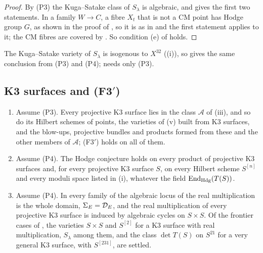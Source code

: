 \begin{proof}
By \textup{(P3)} the Kuga--Satake class of $S_{\lambda}$ is algebraic, and
 gives the first two statements. In a family
$W\to C$, a fibre $X_{t}$ that is not a CM point has Hodge group $G$, as
shown in the proof of , so it is as in
 and the first statement applies to it; the CM fibres
are covered by . So condition (e) of
 holds.
\end{proof}

The Kuga--Satake variety of $S_{\lambda}$ is isogenous to $X^{32}$
((i)), so  gives the same conclusion
from (P3) and (P4);  needs only (P3).

\subsection{K3 surfaces and \textup{(F3$'$)}}\label{ssec:k3all}

\begin{corollary}[K3 surfaces]\label{cor:k3all}
\leavevmode
\begin{enumerate}[label=\textup{(\roman*)},leftmargin=2.6em,itemsep=2pt]
\item Assume \textup{(P3)}. Every projective K3 surface lies in the class
  $\mathcal{A}$ of (iii), and so do its Hilbert schemes of
  points, the varieties of (v) built from K3 surfaces, and
  the blow-ups, projective bundles and products formed from these and the
  other members of $\mathcal{A}$; \textup{(F3$'$)} holds on all of them.
\item Assume \textup{(P4)}. The Hodge conjecture holds on every product of
  projective K3 surfaces and, for every projective K3 surface $S$, on every
  Hilbert scheme $S^{[n]}$ and every moduli space listed in
  (i), whatever the field $\operatorname{End}_{\mathrm{Hdg}}(T(S))$.
\item Assume \textup{(P4)}. In every family of  the algebraic
  locus of the real multiplication is the whole domain,
  $\Sigma_{E}=\mathcal{D}_{E}$, and the real multiplication of every projective K3
  surface is induced by algebraic cycles on $S\times S$. Of the frontier cases
  of , the varieties $S\times S$ and $S^{[2]}$ for a
  K3 surface with real multiplication, $S_{\lambda}$ among them, and the class
  $\det T(S)$ on $S^{21}$ for a very general K3 surface, with $S^{[231]}$, are
  settled.
\end{enumerate}
\end{corollary}

